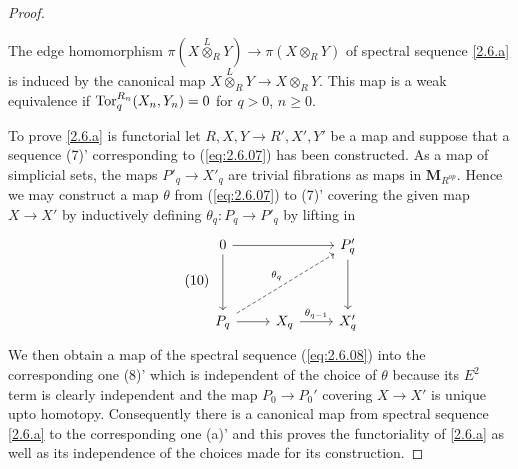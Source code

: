 \documentclass[../main]{subfiles}
\begin{document}
\begin{proof}
\begin{corollary*}
The edge homomorphism $\pi(X\overset{L}{\otimes}_RY)\longrightarrow\pi(X\otimes_RY)$ of spectral sequence \ref{2.6.a} is induced by the canonical map $X\overset{L}{\otimes}_RY\longrightarrow X\otimes_RY$. This map is a weak equivalence if $\operatorname{Tor}_q^{R_n}(X_n,Y_n)=0$ for $q>0$, $n\geq 0$.
\end{corollary*}

To prove \ref{2.6.a} is functorial let $R,X,Y\longrightarrow R',X',Y'$ be a map and suppose that a sequence (7)' corresponding to (\ref{eq:2.6.07}) has been constructed. As a map of simplicial sets, the maps $P'_q\longrightarrow X'_q$ are trivial fibrations as maps in $\mathbf{M}_{R^{op}}$. Hence we may construct a map $\theta$ from (\ref{eq:2.6.07}) to (7)' covering the given map $X\longrightarrow X'$ by inductively defining $\theta_q:P_q\longrightarrow P'_q$ by lifting in 
\begin{equation}\tag{10}
\label{eq:2.6.10}
\begin{tikzcd}
0\arrow[rr]\arrow[dd]&&P'_q\arrow[dd]\\ \\
P_q\arrow[r]\arrow[dashed]{uurr}{\theta_q}&X_q\arrow{r}{\theta_{q-1}}&X_q'
\end{tikzcd}\end{equation}
We then obtain a map of the spectral sequence (\ref{eq:2.6.08}) into the corresponding one (8)' which is independent of the choice of $\theta$ because its $E^2$ term is clearly independent and the map $P_0\longrightarrow P_0'$ covering $X\longrightarrow X'$ is unique upto homotopy. Consequently there is a canonical map from spectral sequence \ref{2.6.a} to the corresponding one (a)' and this proves the functoriality of \ref{2.6.a} as well as its independence of the choices made for its construction.


\end{proof}
\end{document}
